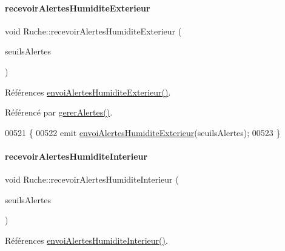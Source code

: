\paragraph{\texorpdfstring{recevoir\+Alertes\+Humidite\+Exterieur}{recevoirAlertesHumiditeExterieur}}
{\footnotesize\ttfamily void Ruche\+::recevoir\+Alertes\+Humidite\+Exterieur (\begin{DoxyParamCaption}\item[{\hyperlink{parametres_8h_aaa6de8207c94675264c90b10b613368d}{Seuils\+Alertes}}]{seuils\+Alertes }\end{DoxyParamCaption})\hspace{0.3cm}{\ttfamily [slot]}}



Références \hyperlink{class_ruche_abef2fd2fdeaee8bc19fa1ce13b32f4d0}{envoi\+Alertes\+Humidite\+Exterieur()}.



Référencé par \hyperlink{class_ruche_a80f3538f081aea887d7199f114dfca01}{gerer\+Alertes()}.


\begin{DoxyCode}
00521 \{
00522     emit \hyperlink{class_ruche_abef2fd2fdeaee8bc19fa1ce13b32f4d0}{envoiAlertesHumiditeExterieur}(seuilsAlertes);
00523 \}
\end{DoxyCode}
\mbox{\label{class_ruche_af7b500ef1469f689dfe6b78ae6e3c025}} 
\paragraph{\texorpdfstring{recevoir\+Alertes\+Humidite\+Interieur}{recevoirAlertesHumiditeInterieur}}
{\footnotesize\ttfamily void Ruche\+::recevoir\+Alertes\+Humidite\+Interieur (\begin{DoxyParamCaption}\item[{\hyperlink{parametres_8h_aaa6de8207c94675264c90b10b613368d}{Seuils\+Alertes}}]{seuils\+Alertes }\end{DoxyParamCaption})\hspace{0.3cm}{\ttfamily [slot]}}



Références \hyperlink{class_ruche_a0f1dfe6d0a677341e29296e044d91975}{envoi\+Alertes\+Humidite\+Interieur()}.



